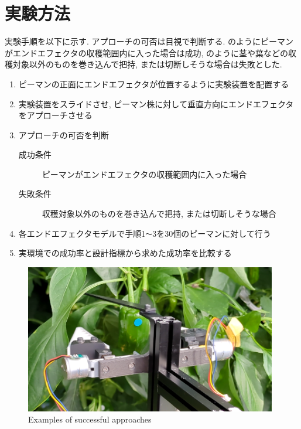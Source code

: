 \section{実験方法}
実験手順を以下に示す. アプローチの可否は目視で判断する.
のようにピーマンがエンドエフェクタの収穫範囲内に入った場合は成功, のように茎や葉などの収穫対象以外のものを巻き込んで把持, または切断しそうな場合は失敗とした.
\begin{enumerate}
  \item ピーマンの正面にエンドエフェクタが位置するように実験装置を配置する
  \item 実験装置をスライドさせ, ピーマン株に対して垂直方向にエンドエフェクタをアプローチさせる
  \item アプローチの可否を判断
  \begin{description}
    \item[成功条件] ピーマンがエンドエフェクタの収穫範囲内に入った場合
    \item[失敗条件] 収穫対象以外のものを巻き込んで把持, または切断しそうな場合
  \end{description}
  \item 各エンドエフェクタモデルで手順1\verb|〜|3を30個のピーマンに対して行う
  \item 実環境での成功率と設計指標から求めた成功率を比較する
\end{enumerate}

\vspace{5mm}
\begin{figure}[H]
     \centering
     \includegraphics[width=110mm]{images/png/success.png}
     \caption{Examples of successful approaches}
     \label{Fig:success}
   \end{figure}

